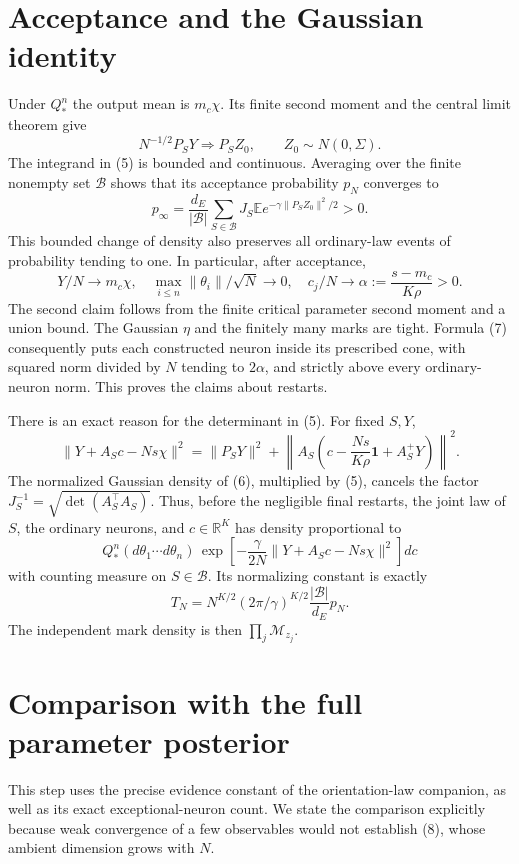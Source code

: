 \documentclass[11pt]{article}
\newcommand{\E}{\mathbb E}\newcommand{\R}{\mathbb R}
\newcommand{\one}{\boldsymbol1}
\begin{document}
\section{Acceptance and the Gaussian identity}
Under $Q_*^n$ the output mean is $m_c\chi$. Its finite second moment
and the central limit theorem give
\[
       N^{-1/2}P_SY\Longrightarrow P_SZ_0,
                           \qquad Z_0\sim N(0,\Sigma).
\]
The integrand in (5) is bounded and continuous. Averaging over the
finite nonempty set $\mathcal B$ shows that its acceptance probability
$p_N$ converges to
\[
 p_\infty=\frac{d_E}{|\mathcal B|}\sum_{S\in\mathcal B}
                     J_S\E e^{-\gamma\|P_SZ_0\|^2/2}>0. \tag{9}
\]
This bounded change of density also preserves all ordinary-law events
of probability tending to one. In particular, after acceptance,
\[
 Y/N\to m_c\chi,\quad
 \max_{i\le n}\|\theta_i\|/\sqrt N\to0,\quad
 c_j/N\to\alpha:=\frac{s-m_c}{K\rho}>0.                 \tag{10}
\]
The second claim follows from the finite critical parameter second
moment and a union bound. The Gaussian $\eta$ and the finitely many
marks are tight. Formula (7) consequently puts each constructed neuron
inside its prescribed cone, with squared norm divided by $N$ tending
to $2\alpha$, and strictly above every ordinary-neuron norm. This
proves the claims about restarts.

There is an exact reason for the determinant in (5). For fixed $S,Y$,
\[
 \|Y+A_Sc-Ns\chi\|^2
   =\|P_SY\|^2+
      \left\|A_S\left(c-\frac{Ns}{K\rho}\one+A_S^+Y\right)\right\|^2.
 \tag{11}
\]
The normalized Gaussian density of (6), multiplied by (5), cancels
the factor $J_S^{-1}=\sqrt{\det(A_S^\top A_S)}$.
Thus, before the negligible final restarts, the joint law of $S$, the
ordinary neurons, and $c\in\R^K$ has density proportional to
\[
 Q_*^n(d\theta_1\cdots d\theta_n)\,
 \exp\left[-\frac\gamma{2N}\|Y+A_Sc-Ns\chi\|^2\right]dc
 \tag{12}
\]
with counting measure on $S\in\mathcal B$. Its normalizing constant is
exactly
\[
 T_N=N^{K/2}(2\pi/\gamma)^{K/2}
                 \frac{|\mathcal B|}{d_E}p_N.           \tag{13}
\]
The independent mark density is then $\prod_j\mathcal M_{z_j}$.

\section{Comparison with the full parameter posterior}
This step uses the precise evidence constant of the orientation-law
companion, as well as its exact exceptional-neuron count. We state the
comparison explicitly because weak convergence of a few observables
would not establish (8), whose ambient dimension grows with $N$.
\end{document}

